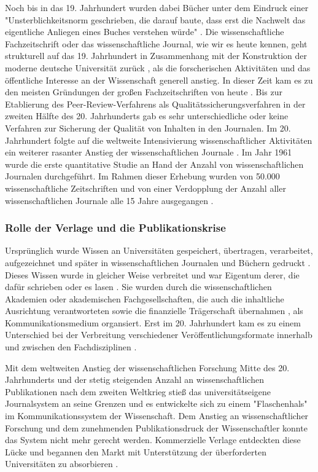 Noch bis in das 19. Jahrhundert wurden dabei Bücher unter dem Eindruck einer "Unsterblichkeitsnorm geschrieben, die darauf baute, dass erst die Nachwelt das eigentliche Anliegen eines Buches verstehen würde" \cite{hagner_2015_sache_buches}. Die wissenschaftliche Fachzeitschrift oder das wissenschaftliche Journal, wie wir es heute kennen, geht strukturell auf das 19. Jahrhundert in Zusammenhang mit der Konstruktion der moderne deutsche Universität zurück \cite{Paletschek_2002}, als die forscherischen Aktivitäten und das öffentliche Interesse an der Wissenschaft generell anstieg. In dieser Zeit kam es zu den meisten Gründungen der großen Fachzeitschriften von heute \cite{porter_1964_scientific}. Bis zur Etablierung des Peer-Review-Verfahrens als Qualitätssicherungsverfahren in der zweiten Hälfte des 20. Jahrhunderts gab es sehr unterschiedliche oder keine Verfahren zur Sicherung der Qualität von Inhalten in den Journalen. Im 20. Jahrhundert folgte auf die weltweite Intensivierung wissenschaftlicher Aktivitäten ein weiterer rasanter Anstieg der wissenschaftlichen Journale \cite[:23]{haustein_2012_multidimensional}. Im Jahr 1961 wurde die erste quantitative Studie an Hand der Anzahl von wissenschaftlichen Journalen durchgeführt. Im Rahmen dieser Erhebung wurden von 50.000 wissenschaftliche Zeitschriften und von einer Verdopplung der Anzahl aller wissenschaftlichen Journale alle 15 Jahre ausgegangen \cite{de_1982_little}.

\subsubsection{Rolle der Verlage und die Publikationskrise}

Ursprünglich wurde Wissen an Universitäten gespeichert, übertragen, verarbeitet, aufgezeichnet und später in wissenschaftlichen Journalen und Büchern gedruckt \cite{kittler_2004}. Dieses Wissen wurde in gleicher Weise verbreitet \cite{hagner_2015_sache_buches} und war Eigentum derer, die dafür schrieben oder es lasen \cite{epaa_Weiner_2001}. Sie wurden durch die wissenschaftlichen Akademien oder akademischen Fachgesellschaften, die auch die inhaltliche Ausrichtung verantworteten sowie die finanzielle Trägerschaft übernahmen \cite{suchen}, als Kommunikationsmedium organsiert. Erst im 20. Jahrhundert kam es zu einem Unterschied bei der Verbreitung verschiedener Veröffentlichungsformate innerhalb und zwischen den Fachdisziplinen \cite{hagner_2015_sache_buches}.

Mit dem weltweiten Anstieg der wissenschaftlichen Forschung Mitte des 20. Jahrhunderts und der stetig steigenden Anzahl an wissenschaftlichen Publikationen nach dem zweiten Weltkrieg stieß das universitätseigene Journalsystem an seine Grenzen und es entwickelte sich zu einem "Flaschenhals" \cite{epaa_Weiner_2001} im Kommunikationssystem der Wissenschaft. Dem Anstieg an wissenschaftlicher Forschung und dem zunehmenden Publikationsdruck der Wissenschaftler konnte das System nicht mehr gerecht werden. Kommerzielle Verlage entdeckten diese Lücke und begannen den Markt mit Unterstützung der überforderten Universitäten zu absorbieren \cite{Hirschi_2015_buch_oa}.

